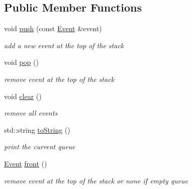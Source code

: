 \subsection*{Public Member Functions}
\begin{DoxyCompactItemize}
\item 
void \hyperlink{classow__sm_1_1EventInQueue_acb76d060a5cf22637e2ec8a016d7ec71}{push} (const \hyperlink{classow__core_1_1Flags_a97da2cfc7e3e4b51aac33116f914bd2b}{Event} \&event)
\begin{DoxyCompactList}\small\item\em add a new event at the top of the stack \end{DoxyCompactList}\item 
void \hyperlink{classow__sm_1_1EventInQueue_ab08404c7156e5d8a92a4b7b0e0ae0ccd}{pop} ()\hypertarget{classow__sm_1_1EventInQueue_ab08404c7156e5d8a92a4b7b0e0ae0ccd}{}\label{classow__sm_1_1EventInQueue_ab08404c7156e5d8a92a4b7b0e0ae0ccd}

\begin{DoxyCompactList}\small\item\em remove event at the top of the stack \end{DoxyCompactList}\item 
void \hyperlink{classow__sm_1_1EventInQueue_ab5ac57be5b8f0fa01af8c830ced46b69}{clear} ()\hypertarget{classow__sm_1_1EventInQueue_ab5ac57be5b8f0fa01af8c830ced46b69}{}\label{classow__sm_1_1EventInQueue_ab5ac57be5b8f0fa01af8c830ced46b69}

\begin{DoxyCompactList}\small\item\em remove all events \end{DoxyCompactList}\item 
std\+::string \hyperlink{classow__sm_1_1EventInQueue_a014a0fd1392eb3e996397279c8db5858}{to\+String} ()\hypertarget{classow__sm_1_1EventInQueue_a014a0fd1392eb3e996397279c8db5858}{}\label{classow__sm_1_1EventInQueue_a014a0fd1392eb3e996397279c8db5858}

\begin{DoxyCompactList}\small\item\em print the current queue \end{DoxyCompactList}\item 
\hyperlink{classow__core_1_1Flags_a97da2cfc7e3e4b51aac33116f914bd2b}{Event} \hyperlink{classow__sm_1_1EventInQueue_a88004c7a4d6679260905ed4253cb2319}{front} ()
\begin{DoxyCompactList}\small\item\em remove event at the top of the stack or none if empty queue \end{DoxyCompactList}\end{DoxyCompactItemize}
